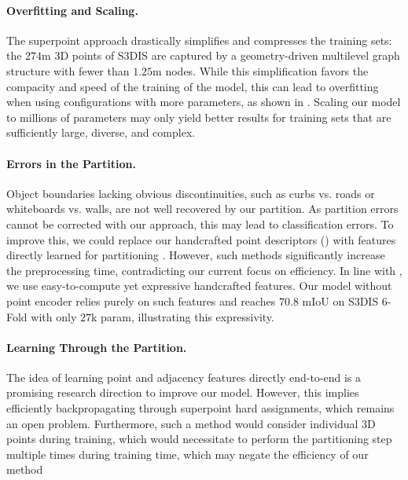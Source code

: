 \paragraph{Overfitting and Scaling.} The superpoint approach drastically simplifies and compresses the training sets: the $274$m 3D points of S3DIS are captured by a geometry-driven multilevel graph structure with fewer than $1.25$m nodes.
While this simplification favors the compacity and speed of the training of the model, this can lead to overfitting when using \SHORTHAND configurations with more parameters, as shown in .
Scaling our model to millions of parameters may only yield better results for training sets that are sufficiently large, diverse, and complex.

\paragraph{Errors in the Partition.} Object boundaries lacking obvious discontinuities, such as curbs vs. roads or whiteboards vs. walls, are not well recovered by our partition. As partition errors cannot be corrected with our approach, this may lead to classification errors.
To improve this, we could replace our handcrafted point descriptors () with features directly learned for partitioning \cite{landrieu2019point,hui2021superpoint}.
However, such methods significantly increase the preprocessing time, contradicting our current focus on efficiency.
In line with \cite{hsu2020incorporating,ran2022surface}, we use easy-to-compute yet expressive handcrafted features. 
Our model \SHORTHANDNANO without point encoder relies purely on such features and reaches $70.8$ mIoU on S3DIS 6-Fold with only $27$k param, illustrating this expressivity.

\paragraph{Learning Through the Partition.} The idea of learning point and adjacency features directly end-to-end is a promising research direction to improve our model. However, this implies efficiently backpropagating through superpoint hard assignments, which remains an open problem. Furthermore, such a method would consider individual 3D points during training, which would necessitate to perform the partitioning step multiple times during training time, which may negate the efficiency of our method

